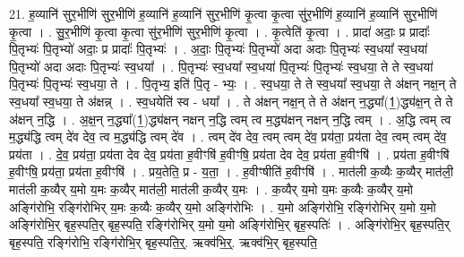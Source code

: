 \documentclass[17pt]{extarticle}
\begin{document}
21. ह॒व्यानि॑ सुर॒भीणि॑ सुर॒भीणि॑ ह॒व्यानि॑ ह॒व्यानि॑ सुर॒भीणि॑ कृ॒त्वा कृ॒त्वा सु॑र॒भीणि॑ ह॒व्यानि॑ ह॒व्यानि॑ सुर॒भीणि॑ कृ॒त्वा । . सु॒र॒भीणि॑ कृ॒त्वा कृ॒त्वा सु॑र॒भीणि॑ सुर॒भीणि॑ कृ॒त्वा । . कृ॒त्वेति॑ कृ॒त्वा । . प्रादा॑ अदाः॒ प्र प्रादाः᳚ पि॒तृभ्यः॑ पि॒तृभ्यो॑ अदाः॒ प्र प्रादाः᳚ पि॒तृभ्यः॑ । . अ॒दाः॒ पि॒तृभ्यः॑ पि॒तृभ्यो॑ अदा अदाः पि॒तृभ्यः॑ स्व॒धया᳚ स्व॒धया॑ पि॒तृभ्यो॑ अदा अदाः पि॒तृभ्यः॑ स्व॒धया᳚ । . पि॒तृभ्यः॑ स्व॒धया᳚ स्व॒धया॑ पि॒तृभ्यः॑ पि॒तृभ्यः॑ स्व॒धया॒ ते ते स्व॒धया॑ पि॒तृभ्यः॑ पि॒तृभ्यः॑ स्व॒धया॒ ते । . पि॒तृभ्य॒ इति॑ पि॒तृ - भ्यः॒ । . स्व॒धया॒ ते ते स्व॒धया᳚ स्व॒धया॒ ते अ॑क्षन् नक्ष॒न् ते स्व॒धया᳚ स्व॒धया॒ ते अ॑क्षन्न् । . स्व॒धयेति॑ स्व - धया᳚ । . ते अ॑क्षन् नक्ष॒न् ते ते अ॑क्षन् न॒द्ध्या᳚(1॒)द्ध्य॑क्ष॒न् ते ते अ॑क्षन् न॒द्धि । . अ॒क्ष॒न् न॒द्ध्या᳚(1॒)द्ध्य॑क्षन् नक्षन् न॒द्धि त्वम् त्व म॒द्ध्य॑क्षन् नक्षन् न॒द्धि त्वम् । . अ॒द्धि त्वम् त्व म॒द्ध्य॑द्धि त्वम् दे॑व देव॒ त्व म॒द्ध्य॑द्धि त्वम् दे॑व । . त्वम् दे॑व देव॒ त्वम् त्वम् दे॑व॒ प्रय॑ता॒ प्रय॑ता देव॒ त्वम् त्वम् दे॑व॒ प्रय॑ता । . दे॒व॒ प्रय॑ता॒ प्रय॑ता देव देव॒ प्रय॑ता ह॒वीꣳषि॑ ह॒वीꣳषि॒ प्रय॑ता देव देव॒ प्रय॑ता ह॒वीꣳषि॑ । . प्रय॑ता ह॒वीꣳषि॑ ह॒वीꣳषि॒ प्रय॑ता॒ प्रय॑ता ह॒वीꣳषि॑ । . प्रय॒तेति॒ प्र - य॒ता॒ । . ह॒वीꣳषीति॑ ह॒वीꣳषि॑ । . मात॑ली क॒व्यैः क॒व्यैर् मात॑ली॒ मात॑ली क॒व्यैर् य॒मो य॒मः क॒व्यैर् मात॑ली॒ मात॑ली क॒व्यैर् य॒मः । . क॒व्यैर् य॒मो य॒मः क॒व्यैः क॒व्यैर् य॒मो अङ्गि॑रोभि॒ रङ्गि॑रोभिर् य॒मः क॒व्यैः क॒व्यैर् य॒मो अङ्गि॑रोभिः । . य॒मो अङ्गि॑रोभि॒ रङ्गि॑रोभिर् य॒मो य॒मो अङ्गि॑रोभि॒र् बृह॒स्पति॒र् बृह॒स्पति॒ रङ्गि॑रोभिर् य॒मो य॒मो 
अङ्गि॑रोभि॒र् बृह॒स्पतिः॑ । . अङ्गि॑रोभि॒र् बृह॒स्पति॒र् बृह॒स्पति॒ रङ्गि॑रोभि॒ रङ्गि॑रोभि॒र् बृह॒स्पति॒र्॒. ऋक्व॑भि॒र्॒. ऋक्व॑भि॒र् बृह॒स्पति॒ 
\end{document}

